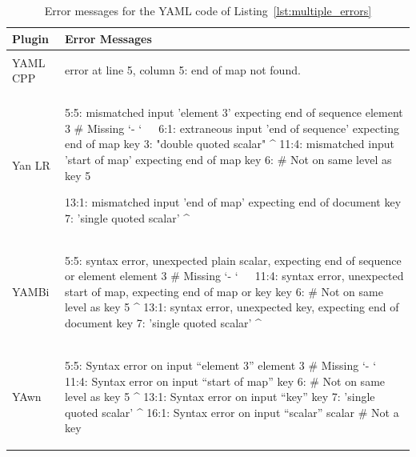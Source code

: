 \begin{table}[H]
  \caption{Error messages for the YAML code of Listing~\ref{lst:multiple_errors}}
  \label{tab:error_messages_final_multiple_errors}
  \centering

  \begin{tabular}{lp{}}
    \toprule
    Plugin & Error Messages\\
    \midrule

    \vspace{0cm}
    YAML CPP &
    \vspace{-0.36cm}
    \begin{textcode}
      error at line 5, column 5: end of map not found.
    \end{textcode}
    \\

    \vspace{0cm}
    Yan LR &
    \vspace{-0.36cm}
    \begin{textcode}
      5:5: mismatched input 'element 3' expecting end of sequence
               element 3 # Missing `- `
               ^^^^^^^^^
      6:1: extraneous input 'end of sequence' expecting end of map
           key 3: "double quoted scalar"
           ^
      11:4: mismatched input 'start of map' expecting end of map
               key 6: # Not on same level as key 5

      13:1: mismatched input 'end of map' expecting end of document
            key 7: 'single quoted scalar'
            ^
    \end{textcode}
    \\

    \vspace{0cm}
    YAMBi &
    \vspace{-0.36cm}
    \begin{textcode}
      5:5: syntax error, unexpected plain scalar,
           expecting end of sequence or element
               element 3 # Missing `- `
               ^^^^^^^^^
      11:4: syntax error, unexpected start of map,
            expecting end of map or key
               key 6: # Not on same level as key 5
               ^
      13:1: syntax error, unexpected key, expecting end of document
            key 7: 'single quoted scalar'
            ^
    \end{textcode}
    \\

    \vspace{0cm}
    YAwn &
    \vspace{-0.36cm}
    \begin{textcode}
      5:5: Syntax error on input “element 3”
               element 3 # Missing `- `
               ^^^^^^^^^
      11:4: Syntax error on input “start of map”
               key 6: # Not on same level as key 5
               ^
      13:1: Syntax error on input “key”
            key 7: 'single quoted scalar'
            ^
      16:1: Syntax error on input “scalar”
            scalar # Not a key
            ^^^^^^
    \end{textcode}
    \\


\end{tabular}
\end{table}
